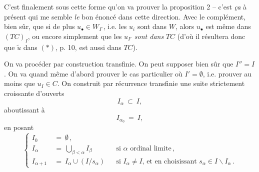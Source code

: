\documentclass[11pt]{article}
\newcommand{\printedpage}[1]{\marginpar{\footnotesize p.~#1}}
\newcommand{\msp}[1]{\marginpar{\footnotesize [#1]}}
\begin{document}
C'est finalement sous cette forme qu'on va prouver la proposition 2 -- c'est \textit{ça} à présent qui me semble \textit{le} bon énoncé dans cette direction. Avec le complément, bien sûr, que si de plus $u_{\bullet} \in W_{I^{\circ}}$, i.e. les $u_i$ sont dans $W$, alors $u_{\bullet}$ est même dans $(TC)_I$, ou encore
\printedpage{7}
simplement que les $u_{I'}$ \textit{sont dans} $TC$ (d'où il résultera donc que $\tilde{u}$ dans $(*)$, p. 10, est aussi dans $TC$).

On va procéder par construction transfinie. On peut supposer bien sûr que $I'' = I$. On va quand même d'abord prouver le cas particulier où $I' = \emptyset$, i.e. prouver au moins que $u_I \in C$. On construit par récurrence transfinie une suite strictement croissante d'ouverts
\[
I_{\alpha} \ \subset \ I,
\]
aboutissant à
\[
I_{\alpha_0} \ = \ I,
\]
en posant
\[
\left\{
\begin{aligned}
I_0 \ &= \ \emptyset\,, \\
I_{\alpha} \ &= \ \textstyle\bigcup_{\beta < \alpha} I_{\beta} && \text{si $\alpha$ ordinal limite}\,, \\
I_{\alpha+1} \ &= \ I_{\alpha} \cup (I/s_{\alpha}) && \text{si $I_{\alpha} \neq I$, et en choisissant $s_{\alpha} \in I \backslash I_{\alpha}$}\,.
\end{aligned}
\right.
\]

\msp{page 12}
\end{document}
